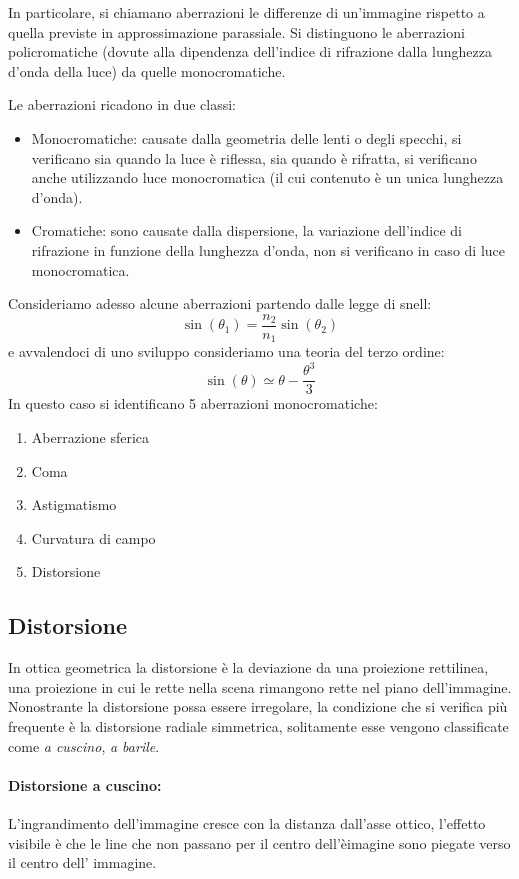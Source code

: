 In particolare, si chiamano aberrazioni le differenze di un'immagine rispetto
a quella previste in approssimazione parassiale. Si distinguono le aberrazioni
policromatiche (dovute alla dipendenza dell'indice di rifrazione dalla
lunghezza d'onda della luce) da quelle monocromatiche.

Le aberrazioni ricadono in due classi:
\begin{itemize}
	\item Monocromatiche: causate dalla geometria delle lenti o degli specchi, si verificano sia quando la luce è riflessa, sia quando è rifratta, si verificano anche utilizzando luce monocromatica (il cui contenuto è un unica lunghezza d'onda).
	\item Cromatiche: sono causate dalla dispersione, la variazione dell'indice di rifrazione in funzione della lunghezza d'onda, non si verificano in caso di luce monocromatica.
\end{itemize}
Consideriamo adesso alcune aberrazioni partendo dalle legge di snell:
\[\sin(\theta_1)=\frac{n_2}{n_1 } \sin(\theta_2)\]
e avvalendoci di uno sviluppo consideriamo una teoria del terzo ordine:
\[\sin(\theta) \simeq \theta - \frac{\theta^3}{3}\]
In questo caso si identificano 5 aberrazioni monocromatiche:
\begin{enumerate}
\item Aberrazione sferica
\item Coma
\item Astigmatismo
\item Curvatura di campo
\item Distorsione
\end{enumerate}

\subsection{Distorsione}
In ottica geometrica la distorsione è la deviazione da una proiezione rettilinea, una proiezione in cui le rette nella scena rimangono rette nel piano dell'immagine.
Nonostrante la distorsione possa essere irregolare, la condizione che si verifica più frequente è la distorsione radiale simmetrica, solitamente esse vengono classificate come \emph{a cuscino}, \emph{a barile}.

\paragraph{Distorsione a cuscino:}
L'ingrandimento dell'immagine cresce con la distanza dall'asse ottico, l'effetto visibile è che le line che non passano per il centro dell'èimagine sono piegate verso il centro dell' immagine.
